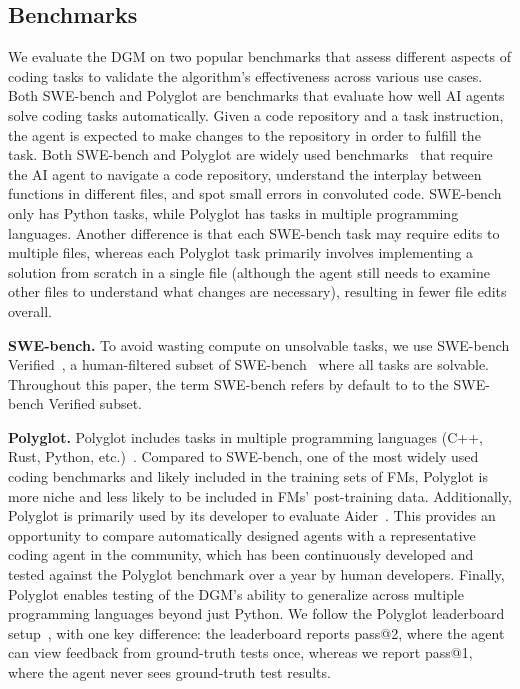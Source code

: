 \subsection{Benchmarks}
\label{sec:benchmarks}

We evaluate the DGM on two popular benchmarks that assess different aspects of coding tasks to validate the algorithm's effectiveness across various use cases. Both SWE-bench and Polyglot are benchmarks that evaluate how well AI agents solve coding tasks automatically. Given a code repository and a task instruction, the agent is expected to make changes to the repository in order to fulfill the task. Both SWE-bench and Polyglot are widely used benchmarks~\citep{zhang2024autocoderover, zhang2024rest, xia2024agentless, cao2024spider2, GoogleDeepMind2025GeminiThinking,aider2024} that require the AI agent to navigate a code repository, understand the interplay between functions in different files, and spot small errors in convoluted code. SWE-bench only has Python tasks, while Polyglot has tasks in multiple programming languages. Another difference is that each SWE-bench task may require edits to multiple files, whereas each Polyglot task primarily involves implementing a solution from scratch in a single file (although the agent still needs to examine other files to understand what changes are necessary), resulting in fewer file edits overall.

\textbf{SWE-bench.} To avoid wasting compute on unsolvable tasks, we use SWE-bench Verified~\citep{openai2024sweverified}, a human-filtered subset of SWE-bench~\citep{jimenez2024swebench} where all tasks are solvable. Throughout this paper, the term SWE-bench refers by default to to the SWE-bench Verified subset.

\textbf{Polyglot.} Polyglot includes tasks in multiple programming languages (C++, Rust, Python, etc.)~\citep{gauthier2024polyglot}. Compared to SWE-bench, one of the most widely used coding benchmarks and likely included in the training sets of FMs, Polyglot is more niche and less likely to be included in FMs' post-training data. Additionally, Polyglot is primarily used by its developer to evaluate Aider~\citep{aider2024}. This provides an opportunity to compare automatically designed agents with a representative coding agent in the community, which has been continuously developed and tested against the Polyglot benchmark over a year by human developers. Finally, Polyglot enables testing of the DGM's ability to generalize across multiple programming languages beyond just Python. We follow the Polyglot leaderboard setup~\citep{gauthier2024polyglot}, with one key difference: the leaderboard reports pass@2, where the agent can view feedback from ground-truth tests once, whereas we report pass@1, where the agent never sees ground-truth test results.

